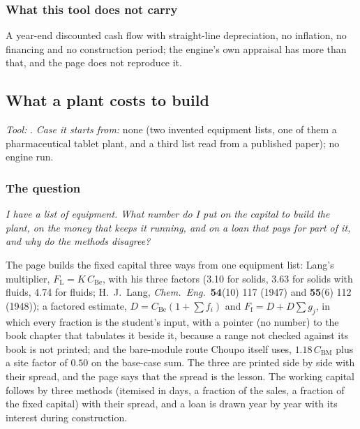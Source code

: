 \documentclass[11pt,a4paper]{article}
\begin{document}
\subsubsection*{What this tool does not carry}

A year-end discounted cash flow with straight-line depreciation, no
inflation, no financing and no construction period; the engine's own appraisal
has more than that, and the page does not reproduce it.

\subsection{What a plant costs to build}\label{sec:edu-plant-cost}


\noindent\textit{\small Tool:} .  \textit{\small
Case it starts from:} none (two invented equipment lists, one of them a
pharmaceutical tablet plant, and a third list read from a published paper); no engine run.

\subsubsection*{The question}

\emph{I have a list of equipment.  What number do I put on the capital to
build the plant, on the money that keeps it running, and on a loan that pays
for part of it, and why do the methods disagree?}

The page builds the fixed capital three ways from one equipment list:
Lang's multiplier, $F_{\mathrm{L}}=K\,C_{\mathrm{Be}}$, with his three
factors (3.10 for solids, 3.63 for solids with fluids, 4.74 for fluids;
H.~J.~Lang, \emph{Chem.\ Eng.}\ \textbf{54}(10) 117 (1947) and
\textbf{55}(6) 112 (1948)); a factored estimate,
$D=C_{\mathrm{Be}}(1+\sum f_i)$ and $F_{\mathrm{f}}=D+D\sum g_j$, in which
every fraction is the student's input, with a pointer (no number) to the
book chapter that tabulates it beside it, because a range not checked
against its book is not printed; and the
bare-module route Choupo itself uses, $1.18\,C_{\mathrm{BM}}$ plus a site
factor of $0.50$ on the base-case sum.  The three are printed side by side
with their spread, and the page says that the spread is the lesson.  The
working capital follows by three methods (itemised in days, a fraction of
the sales, a fraction of the fixed capital) with their spread, and a loan is
drawn year by year with its interest during construction.
\end{document}
